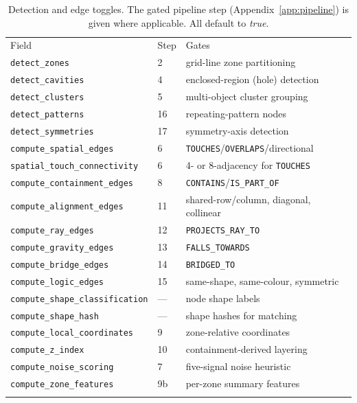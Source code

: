 \begin{table}[htbp]
\centering
\caption{Detection and edge toggles. The gated pipeline step (Appendix~\ref{app:pipeline})
is given where applicable. All default to \emph{true}.}
\label{tab:app-cfg-toggles}
\small
\begin{tabular}{p{5.8cm}p{1.4cm}p{5.4cm}}
\hline\noalign{\smallskip}
Field & Step & Gates \\
\noalign{\smallskip}\hline\noalign{\smallskip}
\texttt{detect\_zones} & 2 & grid-line zone partitioning \\
\texttt{detect\_cavities} & 4 & enclosed-region (hole) detection \\
\texttt{detect\_clusters} & 5 & multi-object cluster grouping \\
\texttt{detect\_patterns} & 16 & repeating-pattern nodes \\
\texttt{detect\_symmetries} & 17 & symmetry-axis detection \\
\texttt{compute\_spatial\_edges} & 6 & \texttt{TOUCHES}/\texttt{OVERLAPS}/directional \\
\texttt{spatial\_touch\_connectivity} & 6 & 4- or 8-adjacency for \texttt{TOUCHES} \\
\texttt{compute\_containment\_edges} & 8 & \texttt{CONTAINS}/\texttt{IS\_PART\_OF} \\
\texttt{compute\_alignment\_edges} & 11 & shared-row/column, diagonal, collinear \\
\texttt{compute\_ray\_edges} & 12 & \texttt{PROJECTS\_RAY\_TO} \\
\texttt{compute\_gravity\_edges} & 13 & \texttt{FALLS\_TOWARDS} \\
\texttt{compute\_bridge\_edges} & 14 & \texttt{BRIDGED\_TO} \\
\texttt{compute\_logic\_edges} & 15 & same-shape, same-colour, symmetric \\
\texttt{compute\_shape\_classification} & --- & node shape labels \\
\texttt{compute\_shape\_hash} & --- & shape hashes for matching \\
\texttt{compute\_local\_coordinates} & 9 & zone-relative coordinates \\
\texttt{compute\_z\_index} & 10 & containment-derived layering \\
\texttt{compute\_noise\_scoring} & 7 & five-signal noise heuristic \\
\texttt{compute\_zone\_features} & 9b & per-zone summary features \\
\noalign{\smallskip}\hline
\end{tabular}
\end{table}

